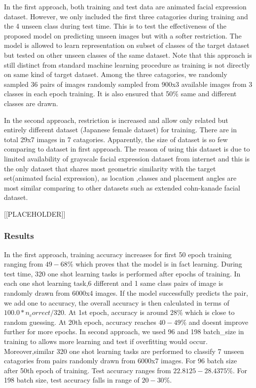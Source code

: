 \documentclass{article}
\begin{document}
In the first approach, both training and test data are animated facial expression dataset. However, we only included the first three catagories during training and the 4 unseen class during test time. This is to test the effectiveness of the proposed model on predicting unseen images but with a softer restriction. The model is allowed to learn representation on subset of classes of the target dataset but tested on other unseen classes of the same dataset. Note that this approach is still distinct from standard machine learning procedure as training is not directly on same kind of target dataset. Among the three catagories, we randomly sampled 36 pairs of images randomly sampled from 900x3 available images from 3 classes in each epoch training. It is also ensured that 50$\%$ same and different classes are drawn.

In the second approach, restriction is increased and allow only related but entirely different dataset (Japanese female dataset) for 
training. There are in total 29x7 images in 7 catagories. Apparently, the size of dataset is so few comparing to dataset in first
approach. The reason of using this dataset is due to limited availability of grayscale facial expression dataset from internet and this is the only dataset that shares most geometric similarity with the target set(animated facial expression), as location ,classes and placement angles are most similar comparing to other datasets such as extended cohn-kanade facial dataset.

[[PLACEHOLDER]]

\subsubsection{\textbf{Results}}

In the first approach, training accuracy increases for first 50 epoch training ranging from $49-68\%$ which proves that the model is in fact learning. During test time, 320 one shot learning tasks is performed after epochs of training. In each one shot learning task,6 different and 1 same class pairs of image is randomly drawn from 6000x4 images. If the model successfully predicts the pair, we add one to accuracy, the overall accuracy is then calculated in terms of $100.0*n_correct / 320$. At 1st epoch, accuracy is around $28\%$ which is close to random guessing. At 20th epoch, accuracy reaches $40-49\%$ and doesnt improve further for more epochs. In second approach, we used 96 and 198 batch_size in training to allows more learning and test if overfitting would occur. Moreover,similar 320 one shot learning tasks are performed to classify 7 unseen catagories from pairs randomly drawn from 6000x7 images. For 96 batch size after 50th epoch of training. Test accuracy ranges from $22.8125-28.4375\%$. For 198 batch size, test accuracy falls in range of $20-30\%$.
\end{document}

